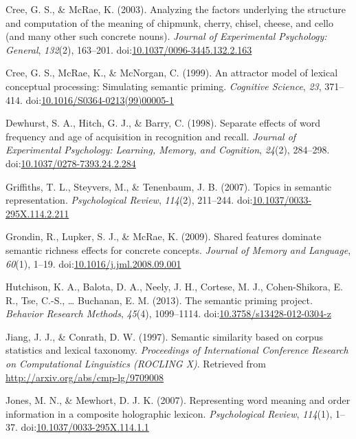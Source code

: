 \documentclass[english,,man]{apa6}
\theoremstyle{definition}
\theoremstyle{definition}
\theoremstyle{definition}
\theoremstyle{remark}
\begin{document}
\leavevmode\hypertarget{ref-Cree2003}{}%
Cree, G. S., \& McRae, K. (2003). Analyzing the factors underlying the
structure and computation of the meaning of chipmunk, cherry, chisel,
cheese, and cello (and many other such concrete nouns). \emph{Journal of
Experimental Psychology: General}, \emph{132}(2), 163--201.
doi:\href{https://doi.org/10.1037/0096-3445.132.2.163}{10.1037/0096-3445.132.2.163}

\leavevmode\hypertarget{ref-Cree1999}{}%
Cree, G. S., McRae, K., \& McNorgan, C. (1999). An attractor model of
lexical conceptual processing: Simulating semantic priming.
\emph{Cognitive Science}, \emph{23}, 371--414.
doi:\href{https://doi.org/10.1016/S0364-0213(99)00005-1}{10.1016/S0364-0213(99)00005-1}

\leavevmode\hypertarget{ref-Dewhurst1998}{}%
Dewhurst, S. A., Hitch, G. J., \& Barry, C. (1998). Separate effects of
word frequency and age of acquisition in recognition and recall.
\emph{Journal of Experimental Psychology: Learning, Memory, and
Cognition}, \emph{24}(2), 284--298.
doi:\href{https://doi.org/10.1037/0278-7393.24.2.284}{10.1037/0278-7393.24.2.284}

\leavevmode\hypertarget{ref-Griffiths2007}{}%
Griffiths, T. L., Steyvers, M., \& Tenenbaum, J. B. (2007). Topics in
semantic representation. \emph{Psychological Review}, \emph{114}(2),
211--244.
doi:\href{https://doi.org/10.1037/0033-295X.114.2.211}{10.1037/0033-295X.114.2.211}

\leavevmode\hypertarget{ref-Grondin2009}{}%
Grondin, R., Lupker, S. J., \& McRae, K. (2009). Shared features
dominate semantic richness effects for concrete concepts. \emph{Journal
of Memory and Language}, \emph{60}(1), 1--19.
doi:\href{https://doi.org/10.1016/j.jml.2008.09.001}{10.1016/j.jml.2008.09.001}

\leavevmode\hypertarget{ref-Hutchison2013}{}%
Hutchison, K. A., Balota, D. A., Neely, J. H., Cortese, M. J.,
Cohen-Shikora, E. R., Tse, C.-S., \ldots{} Buchanan, E. M. (2013). The
semantic priming project. \emph{Behavior Research Methods},
\emph{45}(4), 1099--1114.
doi:\href{https://doi.org/10.3758/s13428-012-0304-z}{10.3758/s13428-012-0304-z}

\leavevmode\hypertarget{ref-Jiang1997}{}%
Jiang, J. J., \& Conrath, D. W. (1997). Semantic similarity based on
corpus statistics and lexical taxonomy. \emph{Proceedings of
International Conference Research on Computational Linguistics (ROCLING
X)}. Retrieved from \url{http://arxiv.org/abs/cmp-lg/9709008}

\leavevmode\hypertarget{ref-Jones2007}{}%
Jones, M. N., \& Mewhort, D. J. K. (2007). Representing word meaning and
order information in a composite holographic lexicon.
\emph{Psychological Review}, \emph{114}(1), 1--37.
doi:\href{https://doi.org/10.1037/0033-295X.114.1.1}{10.1037/0033-295X.114.1.1}
\end{document}
